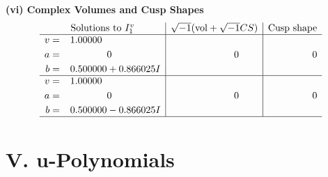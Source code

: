 \documentclass[1p]{elsarticle_modified}
\theoremstyle{definition}
\newcommand{\I}{\sqrt{-1}}
\begin{document}
\newpage\flushleft \textbf{(vi) Complex Volumes and Cusp Shapes}
$$\begin{array}{c|c|c}  
\text{Solutions to }I^v_{1}& \I (\text{vol} + \sqrt{-1}CS) & \text{Cusp shape}\\
 \hline 
\begin{aligned}
v &= \phantom{-}1.00000\phantom{ +0.000000I} \\
a &= \phantom{-0.000000 } 0 \\
b &= \phantom{-}0.500000 + 0.866025 I\end{aligned}
 & \phantom{-0.000000 } 0 & \phantom{-0.000000 } 0 \\ \hline\begin{aligned}
v &= \phantom{-}1.00000\phantom{ +0.000000I} \\
a &= \phantom{-0.000000 } 0 \\
b &= \phantom{-}0.500000 - 0.866025 I\end{aligned}
 & \phantom{-0.000000 } 0 & \phantom{-0.000000 } 0\\
 \hline 
 \end{array}$$\newpage
\newpage\renewcommand{\arraystretch}{1}
\centering \section*{ V. u-Polynomials}
\end{document}

